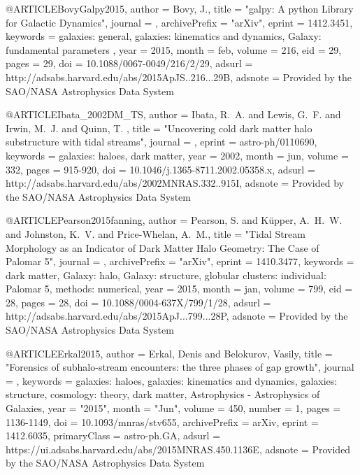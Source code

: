 \documentclass[apj]{emulateapj}
\begin{document}
{{@ARTICLE{BovyGalpy2015,
   author = {{Bovy}, J.},
    title = "{galpy: A python Library for Galactic Dynamics}",
  journal = {\apjs},
archivePrefix = "arXiv",
   eprint = {1412.3451},
 keywords = {galaxies: general, galaxies: kinematics and dynamics, Galaxy: fundamental parameters },
     year = 2015,
    month = feb,
   volume = 216,
      eid = {29},
    pages = {29},
      doi = {10.1088/0067-0049/216/2/29},
   adsurl = {http://adsabs.harvard.edu/abs/2015ApJS..216...29B},
  adsnote = {Provided by the SAO/NASA Astrophysics Data System}
}




@ARTICLE{Ibata_2002DM_TS,
   author = {{Ibata}, R.~A. and {Lewis}, G.~F. and {Irwin}, M.~J. and {Quinn}, T.
	},
    title = "{Uncovering cold dark matter halo substructure with tidal streams}",
  journal = {\mnras},
   eprint = {astro-ph/0110690},
 keywords = {galaxies: haloes, dark matter},
     year = 2002,
    month = jun,
   volume = 332,
    pages = {915-920},
      doi = {10.1046/j.1365-8711.2002.05358.x},
   adsurl = {http://adsabs.harvard.edu/abs/2002MNRAS.332..915I},
  adsnote = {Provided by the SAO/NASA Astrophysics Data System}
}


@ARTICLE{Pearson2015fanning,
   author = {{Pearson}, S. and {K{\"u}pper}, A.~H.~W. and {Johnston}, K.~V. and 
	{Price-Whelan}, A.~M.},
    title = "{Tidal Stream Morphology as an Indicator of Dark Matter Halo Geometry: The Case of Palomar 5}",
  journal = {\apj},
archivePrefix = "arXiv",
   eprint = {1410.3477},
 keywords = {dark matter, Galaxy: halo, Galaxy: structure, globular clusters: individual: Palomar 5, methods: numerical},
     year = 2015,
    month = jan,
   volume = 799,
      eid = {28},
    pages = {28},
      doi = {10.1088/0004-637X/799/1/28},
   adsurl = {http://adsabs.harvard.edu/abs/2015ApJ...799...28P},
  adsnote = {Provided by the SAO/NASA Astrophysics Data System}
}

@ARTICLE{Erkal2015,
       author = {{Erkal}, Denis and {Belokurov}, Vasily},
        title = "{Forensics of subhalo-stream encounters: the three phases of gap growth}",
      journal = {\mnras},
     keywords = {galaxies: haloes, galaxies: kinematics and dynamics, galaxies: structure, cosmology: theory, dark matter, Astrophysics - Astrophysics of Galaxies},
         year = "2015",
        month = "Jun",
       volume = {450},
       number = {1},
        pages = {1136-1149},
          doi = {10.1093/mnras/stv655},
archivePrefix = {arXiv},
       eprint = {1412.6035},
 primaryClass = {astro-ph.GA},
       adsurl = {https://ui.adsabs.harvard.edu/abs/2015MNRAS.450.1136E},
      adsnote = {Provided by the SAO/NASA Astrophysics Data System}
}




}}
\end{document}
